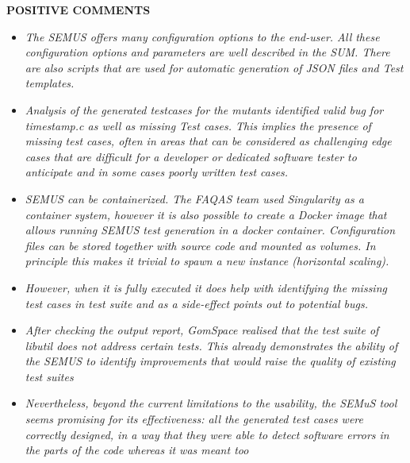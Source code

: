 \textbf{POSITIVE COMMENTS}

\begin{itemize}

  \item \emph{The SEMUS offers many configuration options to the end-user. All these configuration options and parameters are well described in the SUM. There are also scripts that are used for automatic generation of JSON files and Test templates.}

  \item \emph{Analysis of the generated testcases for the mutants identified valid bug for timestamp.c as well as missing Test cases. This implies the presence of missing test cases, often in areas that can be considered as challenging edge cases that are difficult for a developer or dedicated software tester to anticipate and in some cases poorly written test cases.}

  \item \emph{SEMUS can be containerized. The FAQAS team used Singularity as a container system, however it is also possible to create a Docker image that allows running SEMUS test generation in a docker container. Configuration files can be stored together with source code and mounted as volumes. In principle this makes it trivial to spawn a new instance (horizontal scaling).}

  \item \emph{However, when it is fully executed it does help with identifying the missing test cases in test suite and as a side-effect points out to potential bugs.}

  \item \emph{After checking the output report, GomSpace realised that the test suite of libutil does not address certain tests. This already demonstrates the ability of the SEMUS to identify improvements that would raise the quality of existing test suites }

  \item \emph{Nevertheless, beyond the current limitations to the usability, the SEMuS tool seems promising for its effectiveness: all the generated test cases were correctly designed, in a way that they were able to detect software errors in the parts of the code whereas it was meant too}

\end{itemize}

